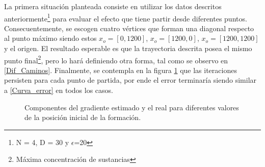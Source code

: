 La primera situación planteada consiste en utilizar los datos descritos anteriormente\footnote[2]{N = 4, D = 30 y $\epsilon$=20} para evaluar el efecto que tiene partir desde diferentes puntos. Consecuentemente, se escogen cuatro vértices que forman una diagonal respecto al punto máximo siendo estos $x_o=[0,1200]$, $x_o=[1200,0]$, $x_o=[1200,1200]$ y el origen. El resultado esperable es que la trayectoria descrita posea el mismo punto final\footnote[3]{Máxima concentración de sustancias}, pero lo hará definiendo otra forma, tal como se observo en \ref{Dif_Caminos}. Finalmente, se contempla en la figura \ref{Gradiente_Diversos_Puntos} que las iteraciones persisten para cada punto de partida, por ende el error terminaría siendo similar a \ref{Curva_error} en todos los casos. 

\begin{figure}[H]
  \begin{center}
    \caption{Componentes del gradiente estimado y el real para diferentes valores de la posición inicial de la formación.}
    \label{Gradiente_Diversos_Puntos}
  \end{center}
\end{figure}

